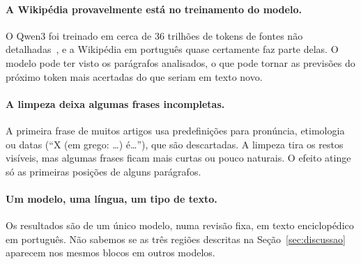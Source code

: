 \paragraph{A Wikipédia provavelmente está no treinamento do modelo.} O Qwen3 foi treinado em
cerca de 36 trilhões de tokens de fontes não detalhadas~\cite{qwen3}, e a Wikipédia em
português quase certamente faz parte delas. O modelo pode ter visto os parágrafos analisados,
o que pode tornar as previsões do próximo token mais acertadas do que seriam em texto novo.

\paragraph{A limpeza deixa algumas frases incompletas.} A primeira frase de muitos artigos usa
predefinições para pronúncia, etimologia ou datas (``X (em grego: \ldots) é\ldots''), que são
descartadas. A limpeza tira os restos visíveis, mas algumas frases ficam mais curtas ou pouco
naturais. O efeito atinge só as primeiras posições de alguns parágrafos.

\paragraph{Um modelo, uma língua, um tipo de texto.} Os resultados são de um único modelo, numa
revisão fixa, em texto enciclopédico em português. Não sabemos se as três regiões descritas na
Seção~\ref{sec:discussao} aparecem nos mesmos blocos em outros modelos.
